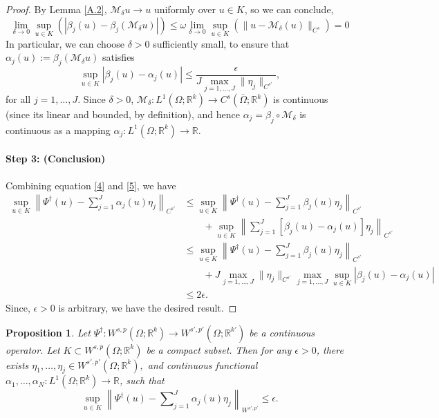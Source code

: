 \documentclass[reqno,9pt]{amsart}
\theoremstyle{plain}
\newtheorem{prop}{Proposition}
\theoremstyle{definition}
\newcommand{\bb}[1]{\mathbb{#1}}
\newcommand{\cal}[1]{\mathcal{#1}}
\begin{document}
\begin{proof}
    By Lemma \ref{A.2}, $\cal M_\delta u \to u$ uniformly over $u \in K$, so we can conclude,
    $$ \lim_{\delta \to 0} \sup\limits_{u \in K}(|\beta_j(u) - \beta_j(\cal M_\delta u)|) \leq \omega \lim_{\delta \to 0}\sup\limits_{u \in K} \left(\|u - \cal M_\delta (u)\|_{C^s}\right) = 0$$
    In particular, we can choose $\delta > 0$ sufficiently small, to ensure that $\alpha_j(u) := \beta_j(\cal M_\delta u)$ satisfies 
    \begin{equation} \label{5}
        \sup_{u \in K}|\beta_j(u) - \alpha_j(u)| \leq \frac{\epsilon}{J \max_{j = 1,\dots,J}\|\eta_j\|_{C^{s'}}},
    \end{equation}
    for all $j = 1, \dots, J$. Since $\delta > 0$, $\cal M_\delta : L^1(\Omega;\bb R^k) \to C^s(\overline{\Omega};\bb R^k)$ is continuous (since its linear and bounded, by definition), and hence $\alpha_j = \beta_j \circ \cal M_\delta$ is continuous as a mapping $\alpha_j : L^1(\Omega;\bb R^k) \to \bb R.$
    \paragraph{\bf Step 3: (Conclusion)} Combining equation \ref{4} and \ref{5}, we have 
    $$
    \begin{aligned}
        \sup\limits_{u \in K} \left\|\Psi^\dag(u) - \sum\nolimits_{j=1}^{J} \alpha_j(u)\eta_j\right\|_{C^{s'}} &\leq \sup\limits_{u \in K} \left\|\Psi^\dag(u) - \sum\nolimits_{j=1}^{J}\beta_j(u)\eta_j\right\|_{C^{s'}}\\
        & \qquad + \sup\limits_{u \in K} \left\|\sum\nolimits_{j=1}^{J}[\beta_j(u) - \alpha_j(u)]\eta_j\right\|_{C^{s'}}\\
        & \leq \sup\limits_{u \in K} \left\|\Psi^\dag(u) - \sum\nolimits_{j=1}^{J} \beta_j(u) \eta_j\right\|_{C^{s'}} \\
        &\qquad + J \max\limits_{j=1,\dots,J} \|\eta_j\|_{C^{s'}} \max\limits_{j=1,\dots,J} \sup\limits_{u \in K} |\beta_j(u) - \alpha_j(u)| \\
        & \leq 2\epsilon.
    \end{aligned}
    $$
    Since, $\epsilon > 0$ is arbitrary, we have the desired result. 
\end{proof}
\begin{prop} \label{A.8}
    Let $\Psi^\dag : W^{s,p}(\Omega; \bb R^k) \to W^{s',p'}(\Omega;\bb R^{k'})$ be a continuous operator. Let $K \subset W^{s,p}(\Omega; \bb R^k)$ be a compact subset. Then for any $\epsilon > 0$, there exists $\eta_1, \dots, \eta_j \in W^{s',p'}(\Omega; \bb R^k),$ and continuous functional $\alpha_1, \dots, \alpha_N: L^1(\Omega; \bb R^k) \to \bb R$, such that 
    $$ \sup\limits_{u \in K} \left\|\Psi^\dag(u) - \sum\nolimits_{j=1}^{J} \alpha_j(u)\eta_j\right\|_{W^{s',p'}} \leq \epsilon.$$
\end{prop}
\end{document}
